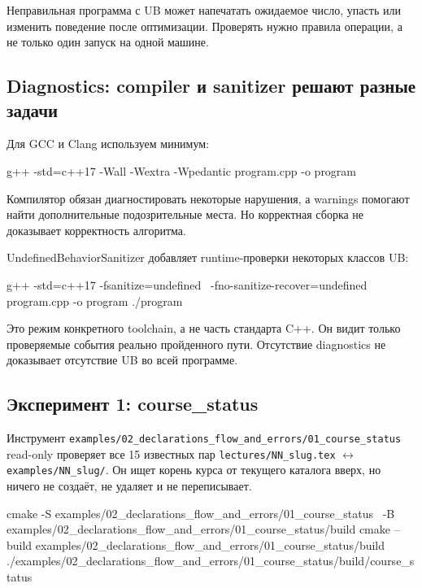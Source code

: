 \begin{ubbox}
Неправильная программа с UB может напечатать ожидаемое число, упасть или
изменить поведение после оптимизации. Проверять нужно правила операции, а не
только один запуск на одной машине.
\end{ubbox}

\subsection{Diagnostics: compiler и sanitizer решают разные задачи}

Для GCC и Clang используем минимум:

\begin{shellcode}
g++ -std=c++17 -Wall -Wextra -Wpedantic program.cpp -o program
\end{shellcode}

Компилятор обязан диагностировать некоторые нарушения, а warnings помогают
найти дополнительные подозрительные места. Но корректная сборка не доказывает
корректность алгоритма.

UndefinedBehaviorSanitizer добавляет runtime-проверки некоторых классов UB:

\begin{shellcode}
g++ -std=c++17 -fsanitize=undefined \
    -fno-sanitize-recover=undefined program.cpp -o program
./program
\end{shellcode}

Это режим конкретного toolchain, а не часть стандарта C++. Он видит только
проверяемые события реально пройденного пути. Отсутствие diagnostics не
доказывает отсутствие UB во всей программе.

\subsection{Эксперимент 1: course\_status}

Инструмент
\texttt{examples/02\_declarations\_flow\_and\_errors/01\_course\_status}
read-only проверяет все 15 известных пар
\texttt{lectures/NN\_slug.tex} $\leftrightarrow$
\texttt{examples/NN\_slug/}. Он ищет корень курса от текущего каталога вверх,
но ничего не создаёт, не удаляет и не переписывает.

\begin{shellcode}
cmake -S examples/02_declarations_flow_and_errors/01_course_status \
      -B examples/02_declarations_flow_and_errors/01_course_status/build
cmake --build examples/02_declarations_flow_and_errors/01_course_status/build
./examples/02_declarations_flow_and_errors/01_course_status/build/course_status
\end{shellcode}

